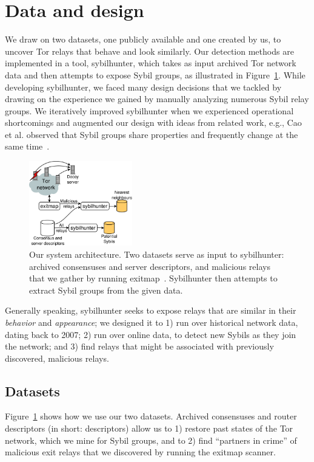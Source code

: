 \section{Data and design}
\label{sec:design}
We draw on two datasets, one publicly available and one created by us, to
uncover Tor relays that behave and look similarly.  Our detection methods are
implemented in a tool, sybilhunter, which takes as input archived Tor network
data and then attempts to expose Sybil groups, as illustrated in
Figure~\ref{fig:system}.  While developing sybilhunter, we faced many design
decisions that we tackled by drawing on the experience we gained by manually
analyzing numerous Sybil relay groups.  We iteratively improved sybilhunter when
we experienced operational shortcomings and augmented our design with ideas from
related work, e.g., Cao et al. observed that Sybil groups share properties and
frequently change at the same time~\cite{Cao2014a}.

\begin{figure}[t]
	\centering
	\includegraphics[width=0.4\textwidth]{diagrams/system_architecture.pdf}
	\caption{Our system architecture.  Two datasets serve as input to
		sybilhunter: archived consensuses and server descriptors, and malicious
		relays that we gather by running exitmap~\cite{Winter2014a}.
		Sybilhunter then attempts to extract Sybil groups from the given data.}
	\label{fig:system}
\end{figure}

Generally speaking, sybilhunter seeks to expose relays that are similar in their
\emph{behavior} and \emph{appearance}; we designed it to 1) run over historical
network data, dating back to 2007; 2) run over online data, to detect new Sybils
as they join the network; and 3) find relays that might be associated with
previously discovered, malicious relays.

\subsection{Datasets}
\label{sec:datasets}
Figure~\ref{fig:system} shows how we use our two datasets.  Archived consensuses
and router descriptors (in short: descriptors) allow us to 1) restore past
states of the Tor network, which we mine for Sybil groups, and to 2) find
``partners in crime'' of malicious exit relays that we discovered by running the
exitmap scanner.


